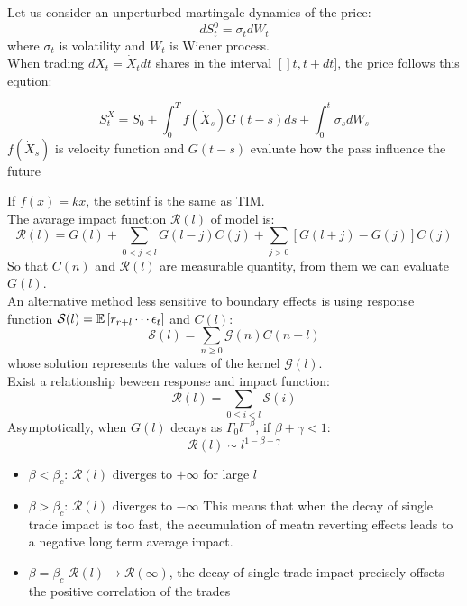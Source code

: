 \begin{mydefinition}
Let us consider an unperturbed martingale dynamics of the price:
\[
dS^0_t = \sigma_tdW_t
\]
where $\sigma_t$ is volatility and $W_t$ is Wiener process.\\
When trading $dX_t = \dot{X}_tdt$ shares in the interval $[]t, t+dt]$, the price follows this eqution:
\end{mydefinition}
\begin{mydefinition}
	\begin{equation}
		S_t^X = S_0 + \int_{0}^{T} f(\dot{X}_s)G(t-s)ds + \int_{0}^t \sigma_sdW_s
	\end{equation}
	$f(\dot{X}_s)$ is velocity function and $G(t-s)$ evaluate how the pass influence the future
\end{mydefinition}
If $f(x) = kx$, the settinf is the same as TIM.\\
The avarage impact function $\mathcal{R}(l)$ of model is:
\[
\mathcal{R}(l) = G(l) + \sum_{0<j<l}G(l-j)C(j) + \sum_{j>0} [G(l+j) - G(j)]C(j)
\]
So that $C(n)$ and $\mathcal{R}(l)$ are measurable quantity, from them we can evaluate $G(l)$.\\
An alternative method less sensitive to boundary effects is using response function $\mathcal{S}(l) = \mathbb{E}\left[r_{r+l}\cdots \epsilon_t\right]$  and $C(l)$:
\[
\mathcal{S}(l) = \sum_{n\geq 0} \mathcal{G}(n)C(n-l)
\]
whose solution represents the values of the kernel $\mathcal{G}(l)$.\\
Exist a relationship beween response and impact function:
\[
\mathcal{R}(l) = \sum_{0\leq i<l}\mathcal{S}(i)
\]
Asymptotically, when $G(l)$ decays as $\Gamma_0l^{-\beta}$, if $\beta + \gamma <1$:
\[
\mathcal{R}(l) \sim l^{1-\beta-\gamma}
\] 
\begin{itemize}
	\item $\beta<\beta_c$: $\mathcal{R}(l)$ diverges to $+ \infty$ for large $l$
	\item  $\beta>\beta_c$: $\mathcal{R}(l)$ diverges to $- \infty$
This means that when the decay of single trade impact is too fast, the accumulation of meatn reverting effects leads to a negative long term average impact.
\item $\beta = \beta_c$ $\mathcal{R}(l) \to \mathcal{R}(\infty)$, the decay of single trade impact precisely offsets the positive correlation of the trades
\end{itemize}
